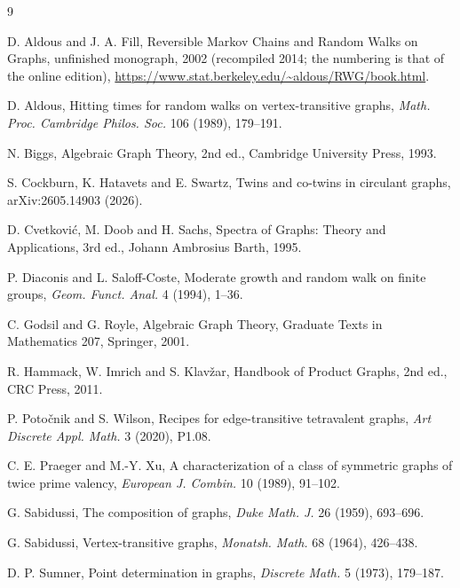 \documentclass[11pt]{amsart}
\theoremstyle{definition}
\begin{document}
\begin{thebibliography}{9}

 D. Aldous and J. A. Fill, Reversible Markov Chains and Random Walks on Graphs, unfinished monograph, 2002 (recompiled 2014; the numbering is that of the online edition), \url{https://www.stat.berkeley.edu/~aldous/RWG/book.html}.

 D. Aldous, Hitting times for random walks on vertex-transitive graphs, \emph{Math. Proc. Cambridge Philos. Soc.} 106 (1989), 179--191.

 N. Biggs, Algebraic Graph Theory, 2nd ed., Cambridge University Press, 1993.

 S. Cockburn, K. Hatavets and E. Swartz, Twins and co-twins in circulant graphs, arXiv:2605.14903 (2026).

 D. Cvetkovi\'c, M. Doob and H. Sachs, Spectra of Graphs: Theory and Applications, 3rd ed., Johann Ambrosius Barth, 1995.

 P. Diaconis and L. Saloff-Coste, Moderate growth and random walk on finite groups, \emph{Geom. Funct. Anal.} 4 (1994), 1--36.

 C. Godsil and G. Royle, Algebraic Graph Theory, Graduate Texts in Mathematics 207, Springer, 2001.

 R. Hammack, W. Imrich and S. Klav\v{z}ar, Handbook of Product Graphs, 2nd ed., CRC Press, 2011.

 P. Poto\v{c}nik and S. Wilson, Recipes for edge-transitive tetravalent graphs, \emph{Art Discrete Appl. Math.} 3 (2020), P1.08.

 C. E. Praeger and M.-Y. Xu, A characterization of a class of symmetric graphs of twice prime valency, \emph{European J. Combin.} 10 (1989), 91--102.

 G. Sabidussi, The composition of graphs, \emph{Duke Math. J.} 26 (1959), 693--696.

 G. Sabidussi, Vertex-transitive graphs, \emph{Monatsh. Math.} 68 (1964), 426--438.

 D. P. Sumner, Point determination in graphs, \emph{Discrete Math.} 5 (1973), 179--187.

\end{thebibliography}
\end{document}
